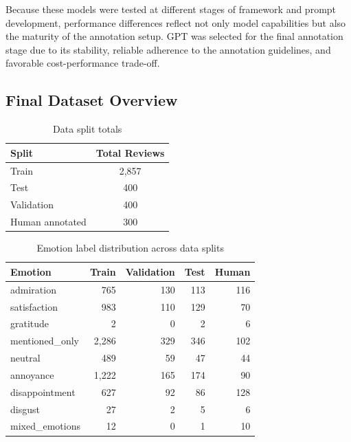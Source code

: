 \documentclass[10pt]{article}
\begin{document}
Because these models were tested at different stages of framework and prompt development, performance differences reflect not only model capabilities but also the maturity of the annotation setup. GPT was selected for the final annotation stage due to its stability, reliable adherence to the annotation guidelines, and favorable cost-performance trade-off.

\subsection{Final Dataset Overview}

\begin{table}[H]
\centering
\caption{Data split totals}
\small
{}
\begin{tabular}{lc}
\toprule
\rowcolor{primary!90!black}
\color{white}\textbf{Split} & \color{white}\textbf{Total Reviews} \\
\midrule
Train & 2,857 \\
Test & 400 \\
Validation & 400 \\
Human annotated & 300 \\
\bottomrule
\end{tabular}
\end{table}

\begin{table}[H]
\centering
\caption{Emotion label distribution across data splits}
\small
\setlength{\tabcolsep}{8pt}
\begin{tabular}{lrrrr}
\toprule
\rowcolor{primary!90!black}
\color{white}\textbf{Emotion} & \color{white}\textbf{Train} & \color{white}\textbf{Validation} & \color{white}\textbf{Test} & \color{white}\textbf{Human} \\
\midrule
admiration & 765 & 130 & 113 & 116 \\
satisfaction & 983 & 110 & 129 & 70 \\
gratitude & 2 & 0 & 2 & 6 \\
mentioned\_only & 2,286 & 329 & 346 & 102 \\
neutral & 489 & 59 & 47 & 44 \\
annoyance & 1,222 & 165 & 174 & 90 \\
disappointment & 627 & 92 & 86 & 128 \\
disgust & 27 & 2 & 5 & 6 \\
mixed\_emotions & 12 & 0 & 1 & 10 \\
\bottomrule
\end{tabular}
\end{table}
\end{document}
